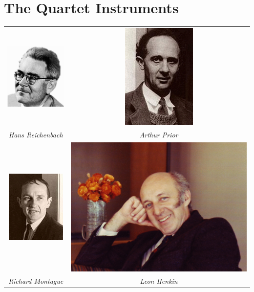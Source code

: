 \section{The Quartet Instruments} \label{introduction}

\begin{center}
\begin{tabular}{cc}
\includegraphics[scale=.5]{reichenbach_med.jpg} &
\includegraphics[scale=.6]{prior.jpg} \\
\emph{Hans Reichenbach}
& \emph{Arthur Prior}\\
\includegraphics[scale=.8]{montague.jpg} &
\includegraphics[scale=.1]{henkin73.jpg}\\
\emph{Richard Montague}
&\emph{Leon Henkin}
\end{tabular}%
\end{center}%

